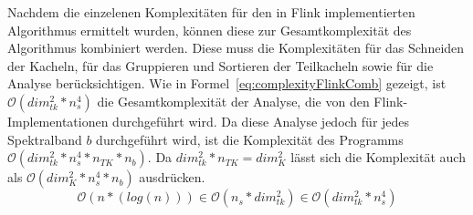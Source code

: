 Nachdem die einzelenen Komplexitäten für den in Flink implementierten Algorithmus ermittelt wurden, können diese zur Gesamtkomplexität des Algorithmus kombiniert werden. Diese muss die Komplexitäten für das Schneiden der Kacheln, für das Gruppieren und Sortieren der Teilkacheln sowie für die Analyse berücksichtigen. Wie in Formel~\ref{eq:complexityFlinkComb} gezeigt, ist $\mathcal{O}(dim_{tk}^2 * n_s^4)$ die Gesamtkomplexität der Analyse, die von den Flink-Implementationen durchgeführt wird. Da diese Analyse jedoch für jedes Spektralband $b$ durchgeführt wird, ist die Komplexität des Programms $\mathcal{O}(dim_{tk}^2 * n_s^4 * n_{TK} * n_b)$. Da $dim_{tk}^2 * n_{TK} = dim_{K}^2$ lässt sich die Komplexität auch als $\mathcal{O}(dim_{K}^2 * n_s^4 * n_b)$ ausdrücken.
%
\begin{equation} \label{eq:complexityFlinkComb}
\mathcal{O}(n*(log(n))) \in \mathcal{O}(n_s * dim_{tk}^2) \in \mathcal{O}(dim_{tk}^2 * n_s^4)
\end{equation}
%
